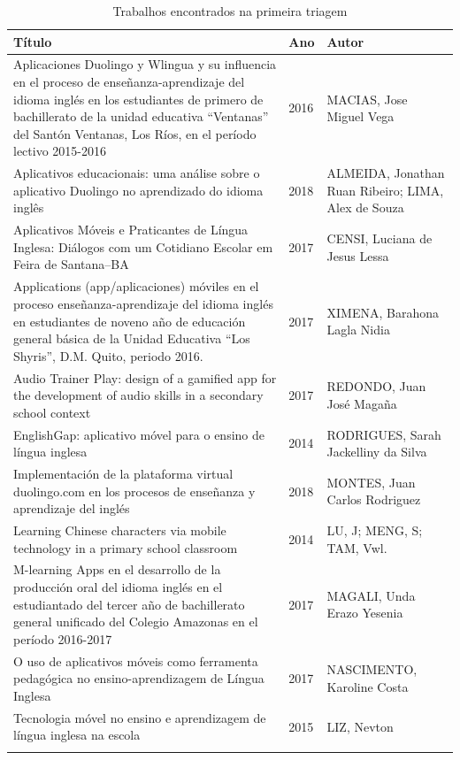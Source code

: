 \documentclass{textolivre}
\begin{document}
\begin{table}[htpb]
\caption{Trabalhos encontrados na primeira triagem}
\label{tab3}
\centering
\begin{tabular}{p{}p{}p{}}
\toprule 
Título & Ano & Autor
\\
\midrule
\arrayrulecolor[gray]{.7}
Aplicaciones Duolingo y Wlingua y su influencia en el proceso de enseñanza-aprendizaje del idioma inglés en los estudiantes de primero de bachillerato de la unidad educativa “Ventanas” del Santón Ventanas, Los Ríos, en el período lectivo 2015-2016 & 2016 & MACIAS, Jose Miguel Vega
\\
\midrule
Aplicativos educacionais: uma análise sobre o aplicativo Duolingo no aprendizado do idioma inglês & 2018 & ALMEIDA, Jonathan Ruan Ribeiro; LIMA, Alex de Souza
\\
\midrule
Aplicativos Móveis e Praticantes de Língua Inglesa: Diálogos com um Cotidiano Escolar em Feira de Santana–BA & 2017 & CENSI, Luciana de Jesus Lessa
\\
\midrule
Applications (app/aplicaciones) móviles en el proceso enseñanza-aprendizaje del idioma inglés en estudiantes de noveno año de educación general básica de la Unidad Educativa “Los Shyris”, D.M. Quito, periodo 2016. & 2017 & XIMENA, Barahona Lagla Nidia
\\
\midrule
Audio Trainer Play: design of a gamified app for the development of audio skills in a secondary school context & 2017 & REDONDO, Juan José Magaña
\\
\midrule
EnglishGap: aplicativo móvel para o ensino de língua inglesa	& 2014 & RODRIGUES, Sarah Jackelliny da Silva
\\
\midrule
Implementación de la plataforma virtual duolingo.com en los procesos de enseñanza y aprendizaje del inglés & 2018 & MONTES, Juan Carlos Rodriguez
\\
\midrule
Learning Chinese characters via mobile technology in a primary school classroom & 2014 & LU, J; MENG, S; TAM, Vwl.
\\
\midrule
M-learning Apps en el desarrollo de la producción oral del idioma inglés en el estudiantado del tercer año de bachillerato general unificado del Colegio Amazonas en el período 2016-2017 & 2017 & MAGALI, Unda Erazo Yesenia
\\
\midrule
O uso de aplicativos móveis como ferramenta pedagógica no ensino-aprendizagem de Língua Inglesa & 2017 & NASCIMENTO, Karoline Costa
\\
\midrule
Tecnologia móvel no ensino e aprendizagem de língua inglesa na escola & 2015 & LIZ, Nevton
\\ 
\arrayrulecolor{black}
\bottomrule
\end{tabular}
\centering
\end{table}
\end{document}

